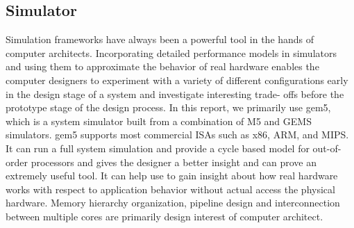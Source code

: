 \subsection{Simulator}
Simulation frameworks have always been a powerful tool in the hands of computer architects. Incorporating detailed performance models in simulators and using them to approximate the behavior of real hardware enables the computer designers to experiment with a variety of different configurations early in the design stage of a system and investigate interesting trade- offs before the prototype stage of the design process. 
In this report, we primarily use gem5, which is a system simulator built from a combination of M5 and GEMS simulators. gem5 supports most commercial ISAs such as x86, ARM, and MIPS. It can run a full system simulation and provide a cycle based model for out-of-order processors and gives the designer a better insight and can prove an extremely useful tool. It can help use to gain insight about how real hardware works with respect to application behavior without actual access the physical hardware. Memory hierarchy organization, pipeline design and interconnection between multiple cores are primarily design interest of computer architect.   












